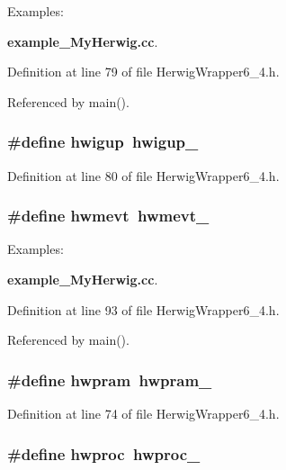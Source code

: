 \begin{Desc}
\item[Examples: ]\par
{\bf example\_\-My\-Herwig.cc}.\end{Desc}


Definition at line 79 of file Herwig\-Wrapper6\_\-4.h.

Referenced by main().
\subsubsection{\setlength{\rightskip}{0pt plus 5cm}\#define hwigup~hwigup\_\-}\label{HerwigWrapper6__4_8h_19d491d62a086121b613f506af83d965}




Definition at line 80 of file Herwig\-Wrapper6\_\-4.h.
\subsubsection{\setlength{\rightskip}{0pt plus 5cm}\#define hwmevt~hwmevt\_\-}\label{HerwigWrapper6__4_8h_542a0153c7e980429597fe68080101d1}


\begin{Desc}
\item[Examples: ]\par
{\bf example\_\-My\-Herwig.cc}.\end{Desc}


Definition at line 93 of file Herwig\-Wrapper6\_\-4.h.

Referenced by main().
\subsubsection{\setlength{\rightskip}{0pt plus 5cm}\#define hwpram~{\bf hwpram\_\-}}\label{HerwigWrapper6__4_8h_cb4d15f11e386928758e82108c0b7214}




Definition at line 74 of file Herwig\-Wrapper6\_\-4.h.
\subsubsection{\setlength{\rightskip}{0pt plus 5cm}\#define hwproc~{\bf hwproc\_\-}}\label{HerwigWrapper6__4_8h_4830887e0a0c16740d6726511b833958}


